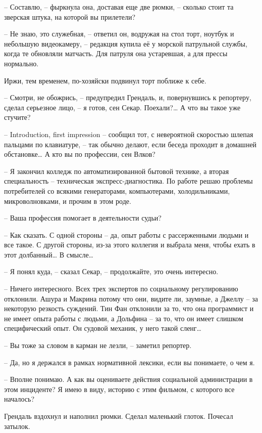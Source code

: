 -- Составлю, -- фыркнула она, доставая еще две рюмки, -- сколько стоит та зверская штука, на которой вы прилетели?

-- Не знаю, это служебная, -- ответил он, водружая на стол торт, ноутбук и небольшую видеокамеру, -- редакция купила её у морской патрульной службы, когда те обновляли матчасть. Для патруля она устаревшая, а для прессы нормально.

Иржи, тем временем, по-хозяйски подвинул торт поближе к себе.

-- Смотри, не обожрись, -- предупредил Грендаль, и, повернувшись к репортеру, сделал серьезное лицо, -- я готов, сен Секар. Поехали?\ldots{} А что вы такое уже стучите?

-- Introduction, first impression -- сообщил тот, с невероятной скоростью шлепая пальцами по клавиатуре, -- так обычно делают, если беседа проходит в домашней обстановке\ldots{} А кто вы по профессии, сен Влков?

-- Я закончил колледж по автоматизированной бытовой технике, а вторая специальность -- техническая экспресс-диагностика. По работе решаю проблемы потребителей со всякими генераторами, компьютерами, холодильниками, микроволновками, и прочим в этом роде.

-- Ваша профессия помогает в деятельности судьи?

-- Как сказать. С одной стороны -- да, опыт работы с рассерженными людьми и все такое. С другой стороны, из-за этого коллегия и выбрала меня, чтобы ехать в этот долбанный\ldots{} В смысле\ldots{}

-- Я понял куда, -- сказал Секар, -- продолжайте, это очень интересно.

-- Ничего интересного. Всех трех экспертов по социальному регулированию отклонили. Ашура и Макрина потому что они, видите ли, заумные, а Джеллу -- за некоторую резкость суждений. Тин Фан отклонили за то, что она программист и не имеет опыта работы с людьми, а Дольфина -- за то, что он имеет слишком специфический опыт. Он судовой механик, у него такой сленг\ldots{}

-- Вы тоже за словом в карман не лезли, -- заметил репортер.

-- Да, но я держался в рамках нормативной лексики, если вы понимаете, о чем я.

-- Вполне понимаю. А как вы оцениваете действия социальной администрации в этом инциденте? Я имею в виду, историю с этим фильмом, с которого все началось?

Грендаль вздохнул и наполнил рюмки. Сделал маленький глоток. Почесал затылок.

